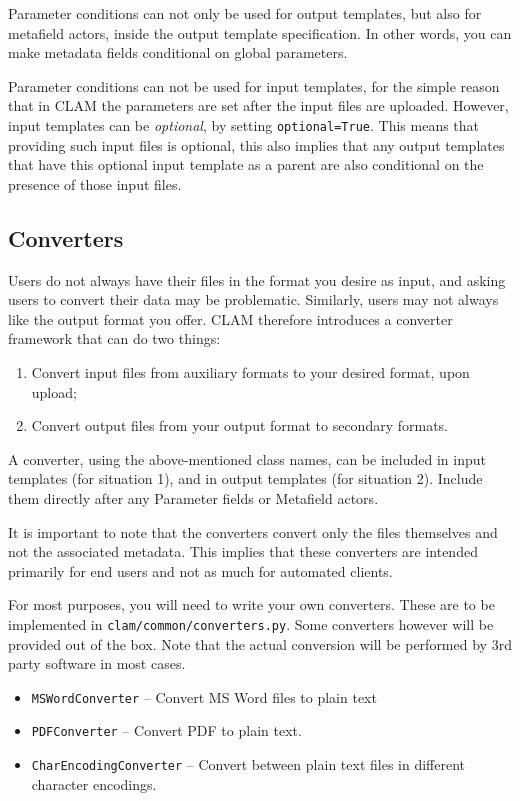 \documentclass[a4paper,12pt]{report}
\begin{document}
Parameter conditions can not only be used for output templates, but also
for metafield actors, inside the output template specification. In other
words, you can make metadata fields conditional on global parameters.

Parameter conditions can not be used for input templates, for the simple
reason that in CLAM the parameters are set after the input files are uploaded.
However, input templates can be \emph{optional}, by setting
\texttt{optional=True}. This means that providing such input files is optional,
this also implies that any output templates that have this optional input
template as a parent are also conditional on the presence of those input files.


\subsection{Converters}

Users do not always have their files in the format you desire as input, and
asking users to convert their data may be problematic. Similarly, users may not
always like the output format you offer. CLAM therefore introduces a converter
framework that can do two things:

\begin{enumerate}
\item Convert input files from auxiliary formats to your desired format, upon upload;
\item Convert output files from your output format to secondary formats.
\end{enumerate}

A converter, using the above-mentioned class names, can be included in input
templates (for situation 1), and in output templates (for situation 2). Include
them directly after any Parameter fields or Metafield actors.

It is important to note that the converters convert only the files themselves
and not the associated metadata. This implies that these converters are
intended primarily for end users and not as much for automated clients.

For most purposes, you will need to write your own converters. These are to be
implemented in \texttt{clam/common/converters.py}. Some converters however will
be provided out of the box. Note that the actual conversion will be performed
by 3rd party software in most cases.

\begin{itemize}
\item \texttt{MSWordConverter} -- Convert MS Word files to plain text
\item \texttt{PDFConverter} -- Convert PDF to plain text.
\item \texttt{CharEncodingConverter} -- Convert between plain text files in different character encodings.
\end{itemize}
\end{document}
